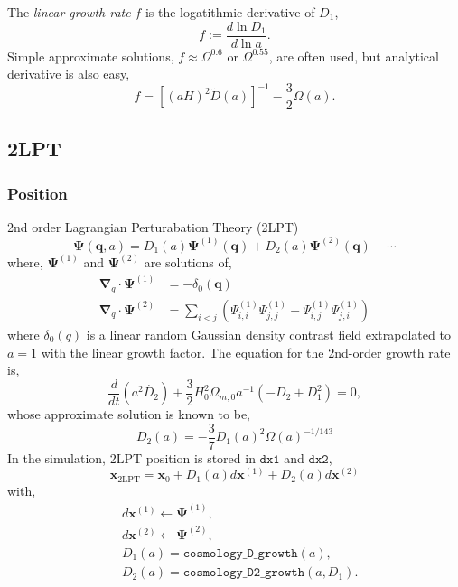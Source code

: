 \documentclass[a4paper]{article}
\begin{document}
%
The \textit{linear growth rate} $f$ is the logatithmic derivative of $D_1$,
\begin{equation}
  f := \frac{d\ln D_1}{d\ln a}.
\end{equation}
Simple approximate solutions, $f \approx \Omega^{0.6}$ or
$\Omega^{0.55}$, are often used, but analytical derivative is also easy,
\begin{equation}
  f = \left[ (aH)^2 \tilde{D}(a) \right]^{-1} - \frac{3}{2} \Omega(a).
\end{equation}

\subsection{2LPT}
\subsubsection{Position}
2nd order Lagrangian Perturabation Theory (2LPT)
\begin{equation}
  \bm{\Psi}(\bm{q}, a) =
    D_1(a) \bm{\Psi}^{(1)}(\bm{q}) + D_2(a) \bm{\Psi}^{(2)}(\bm{q}) + \cdots
\end{equation}
where, $\bm{\Psi}^{(1)}$ and $\bm{\Psi}^{(2)}$ are solutions of,
\begin{align}
  \bm{\nabla}_q \cdot \bm{\Psi}^{(1)} &= - \delta_0(\bm{q})\\
  \bm{\nabla}_q \cdot \bm{\Psi}^{(2)} &= \sum_{i < j}
    \left( \Psi^{(1)}_{i,i} \Psi^{(1)}_{j,j} - \Psi^{(1)}_{i,j} \Psi^{(1)}_{j,i}
    \right)
\end{align}
where $\delta_0(q)$ is a linear random Gaussian density contrast field
extrapolated to $a=1$ with the linear growth factor.
The equation for the 2nd-order growth rate is,
\begin{equation}
  \label{eq:second-growth-factor}
  \frac{d}{dt} ( a^2 \dot{D_2} )
    + \frac{3}{2}H_0^2 \Omega_{m,0} a^{-1} (-D_2 + D_1^2) = 0,
\end{equation}
whose approximate solution is known to be,
\begin{equation}
  D_2(a) = -\frac{3}{7} D_1(a)^2 \Omega(a)^{-1/143}
\end{equation}
%
In the simulation, 2LPT position is stored in $\texttt{dx1}$ and $\texttt{dx2}$,
\begin{equation}
  \bm{x}_\mathrm{2LPT} = \bm{x}_0 + D_1(a) d\bm{x}^{(1)} + D_2(a) d\bm{x}^{(2)}
\end{equation}
with,
\begin{align}
  &d\bm{x}^{(1)} \leftarrow \bm{\Psi}^{(1)},\\
  &d\bm{x}^{(2)} \leftarrow \bm{\Psi}^{(2)},\\
  &D_1(a) = \texttt{cosmology\_D\_growth}(a),\\
  &D_2(a) =  \texttt{cosmology\_D2\_growth}(a, D_1).          
\end{align}
\end{document}

